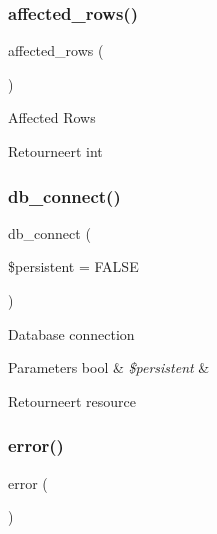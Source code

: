 \subsubsection{\texorpdfstring{affected\_rows()}{affected\_rows()}}
{\footnotesize\ttfamily affected\+\_\+rows (\begin{DoxyParamCaption}{ }\end{DoxyParamCaption})}

Affected Rows

\begin{DoxyReturn}{Retourneert}
int 
\end{DoxyReturn}
\mbox{\label{class_c_i___d_b__postgre__driver_a52bf595e79e96cc0a7c907a9b45aeb4d}} 
\subsubsection{\texorpdfstring{db\_connect()}{db\_connect()}}
{\footnotesize\ttfamily db\+\_\+connect (\begin{DoxyParamCaption}\item[{}]{\$persistent = {\ttfamily FALSE} }\end{DoxyParamCaption})}

Database connection


\begin{DoxyParams}[1]{Parameters}
bool & {\em \$persistent} & \\
\hline
\end{DoxyParams}
\begin{DoxyReturn}{Retourneert}
resource 
\end{DoxyReturn}
\mbox{\label{class_c_i___d_b__postgre__driver_a43b8d30b879d4f09ceb059b02af2bc02}} 
\subsubsection{\texorpdfstring{error()}{error()}}
{\footnotesize\ttfamily error (\begin{DoxyParamCaption}{ }\end{DoxyParamCaption})}

